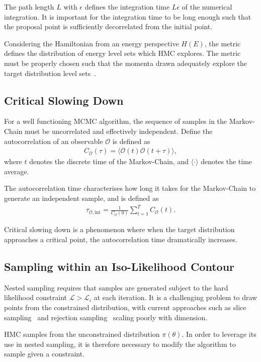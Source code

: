\documentclass[11pt]{article}
\begin{document}
    The path length $L$ with $\epsilon$ defines the integration time $L\epsilon$ of the numerical integration.
    It is important for the integration time to be long enough such that the proposal point is sufficiently decorrelated
    from the initial point.

    Considering the Hamiltonian from an energy perspective $H(E)$, the metric defines the distribution of energy level
    sets which HMC explores.
    The metric must be properly chosen such that the momenta drawn adequately explore the target distribution level
    sets~\cite{betancourt2016energymetric}.

\subsection{Critical Slowing Down}\label{subsec:critical_slowing}
    For a well functioning MCMC algorithm, the sequence of samples in the Markov-Chain must be uncorrelated and
    effectively independent.
    Define the autocorrelation of an observable $\mathcal{O}$ is defined as
    \begin{equation}\label{eq:autocorrelation}
    \begin{aligned}
        C_{\mathcal{O}}(\tau) = \langle \mathcal{O}(t) \mathcal{O}(t + \tau) \rangle,
    \end{aligned}
    \end{equation}
    where $t$ denotes the discrete time of the Markov-Chain, and $\langle \cdot \rangle$ denotes the time average.

    The autocorrelation time characterises how long it takes for the Markov-Chain to generate an independent sample,
    and is defined as
    \begin{equation}\label{eq:autocorrelation_time}
    \begin{aligned}
        \tau_{\mathcal{O}, \text{int}} = \frac{1}{C_{\mathcal{O}}(0)} \sum_{t=1}^T C_{\mathcal{O}}(t).
    \end{aligned}
    \end{equation}

    Critical slowing down is a phenomenon where when the target distribution approaches a critical point,
    the autocorrelation time dramatically increases.

\subsection{Sampling within an Iso-Likelihood Contour}\label{subsec:isolikelood_sampling}
    Nested sampling requires that samples are generated subject to the hard likelihood constraint
    $\mathcal{L} > \mathcal{L}_i$ at each iteration.
    It is a challenging problem to draw points from the constrained distribution, with current approaches such as
    slice sampling~\cite{neal2003slice} and rejection sampling~\cite{Feroz_2009} scaling poorly with dimension.

    HMC samples from the unconstrained distribution $\pi(\theta)$.
    In order to leverage its use in nested sampling, it is therefore necessary to modify the algorithm to sample
    given a constraint.
\end{document}
